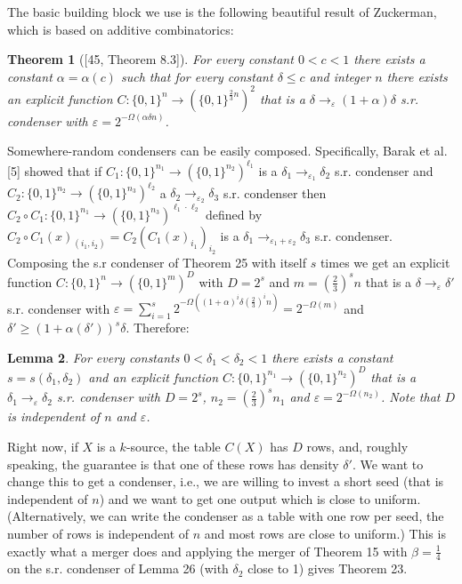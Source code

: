 \documentclass[10pt,a4paper]{article}
\newtheorem{theorem}{Theorem}
\newtheorem{lemma}[theorem]{Lemma}
\begin{document}
The basic building block we use is the following beautiful result of Zuckerman, which is based on additive combinatorics:
\begin{theorem}[{[45, Theorem 8.3]}]
For every constant $0<c<1$ there exists a constant $\alpha=\alpha(c)$ such that for every constant $\delta\le c$ and integer $n$ there exists an explicit function $C:\{0,1\}^n\to(\{0,1\}^{\frac23n})^2$ that is a $\delta\to_\varepsilon(1+\alpha)\delta$ s.r. condenser with $\varepsilon=2^{-\Omega(\alpha\delta n)}$.
\end{theorem}
Somewhere-random condensers can be easily composed. Specifically, Barak et al. [5] showed that if $C_1:\{0,1\}^{n_1}\to(\{0,1\}^{n_2})^{\ell_1}$ is a $\delta_1\to_{\varepsilon_1}\delta_2$ s.r. condenser and $C_2:\{0,1\}^{n_2}\to(\{0,1\}^{n_3})^{\ell_2}$ a $\delta_2\to_{\varepsilon_2}\delta_3$ s.r. condenser then $C_2\circ C_1:\{0,1\}^{n_1}\to(\{0,1\}^{n_3})^{\ell_1\cdot\ell_2}$ defined by $C_2\circ C_1(x)_{(i_1,i_2)}=C_2(C_1(x)_{i_1})_{i_2}$ is a $\delta_1\to_{\varepsilon_1+\varepsilon_2}\delta_3$ s.r. condenser.
Composing the s.r condenser of Theorem 25 with itself $s$ times we get an explicit function $C:\{0,1\}^n\to(\{0,1\}^m)^D$ with $D=2^s$ and $m=(\frac23)^sn$ that is a $\delta\to_\varepsilon\delta'$ s.r. condenser with $\varepsilon=\sum_{i=1}^s2^{-\Omega((1+\alpha)^i\delta(\frac23)^in)}=2^{-\Omega(m)}$ and $\delta'\ge(1+\alpha(\delta'))^s\delta$. Therefore:
\begin{lemma}
For every constants $0<\delta_1<\delta_2<1$ there exists a constant $s=s(\delta_1,\delta_2)$ and an explicit function $C:\{0,1\}^{n_1}\to(\{0,1\}^{n_2})^D$ that is a $\delta_1\to_\varepsilon\delta_2$ s.r. condenser with $D=2^s$, $n_2=(\frac23)^sn_1$ and $\varepsilon=2^{-\Omega(n_2)}$. Note that $D$ is independent of $n$ and $\varepsilon$.
\end{lemma}
Right now, if $X$ is a $k$-source, the table $C(X)$ has $D$ rows, and, roughly speaking, the guarantee is that one of these rows has density $\delta'$. We want to change this to get a condenser, i.e., we are willing to invest a short seed (that is independent of $n$) and we want to get one output which is close to uniform. (Alternatively, we can write the condenser as a table with one row per seed, the number of rows is independent of $n$ and most rows are close to uniform.) This is exactly what a merger does and applying the merger of Theorem 15 with $\beta=\frac14$ on the s.r. condenser of Lemma 26 (with $\delta_2$ close to 1) gives Theorem 23.
\end{document}
